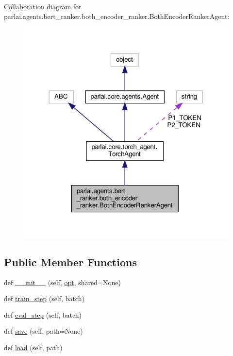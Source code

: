 Collaboration diagram for parlai.\+agents.\+bert\+\_\+ranker.\+both\+\_\+encoder\+\_\+ranker.\+Both\+Encoder\+Ranker\+Agent\+:
\nopagebreak
\begin{figure}[H]
\begin{center}
\leavevmode
\includegraphics[width=318pt]{db/d0b/classparlai_1_1agents_1_1bert__ranker_1_1both__encoder__ranker_1_1BothEncoderRankerAgent__coll__graph}
\end{center}
\end{figure}
\subsection*{Public Member Functions}
\begin{DoxyCompactItemize}
\item 
def \hyperlink{classparlai_1_1agents_1_1bert__ranker_1_1both__encoder__ranker_1_1BothEncoderRankerAgent_a96d864d610277625195f71a615c0f585}{\+\_\+\+\_\+init\+\_\+\+\_\+} (self, \hyperlink{classparlai_1_1core_1_1torch__agent_1_1TorchAgent_a785bb920cf8c8afc3e9bf6a8b77e335a}{opt}, shared=None)
\item 
def \hyperlink{classparlai_1_1agents_1_1bert__ranker_1_1both__encoder__ranker_1_1BothEncoderRankerAgent_a49ef7547db36c1570b8c10d0c8bee42e}{train\+\_\+step} (self, batch)
\item 
def \hyperlink{classparlai_1_1agents_1_1bert__ranker_1_1both__encoder__ranker_1_1BothEncoderRankerAgent_a6d189366af4a1264770d59e4b114967a}{eval\+\_\+step} (self, batch)
\item 
def \hyperlink{classparlai_1_1agents_1_1bert__ranker_1_1both__encoder__ranker_1_1BothEncoderRankerAgent_a5e8419dfd48e5a9b0a999058a9537831}{save} (self, path=None)
\item 
def \hyperlink{classparlai_1_1agents_1_1bert__ranker_1_1both__encoder__ranker_1_1BothEncoderRankerAgent_a3900966ef98a770cf6e871bb7de67907}{load} (self, path)
\end{DoxyCompactItemize}
